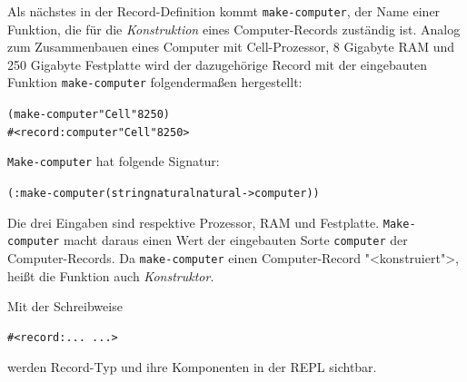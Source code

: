 Als nächstes in der Record-Definition kommt \texttt{make-computer},
der Name einer Funktion, die für die \textit{Konstruktion} eines
Computer-Records zuständig ist.  Analog zum Zusammenbauen eines
Computer mit Cell-Prozessor, 8 Gigabyte RAM und 250 Gigabyte
Festplatte wird der dazugehörige Record mit der eingebauten Funktion
\texttt{make-computer} folgendermaßen hergestellt:
%
\begin{alltt}
(make-computer "Cell" 8 250)
\evalsto{} #<record:computer "Cell" 8 250>
\end{alltt}
%
\texttt{Make-computer} hat folgende Signatur:
%
\begin{alltt}
(: make-computer (string natural natural -> computer))
\end{alltt}
%
Die drei Eingaben sind respektive Prozessor, RAM und Festplatte.
\texttt{Make-computer} macht daraus einen Wert der eingebauten Sorte
\texttt{computer} der Computer-Records.  Da \texttt{make-computer}
einen Computer-Record "<konstruiert">, heißt die Funktion auch
\textit{Konstruktor}.

Mit der Schreibweise
%
\begin{verbatim}
#<record:... ...>
\end{verbatim}
%
werden Record-Typ und ihre Komponenten in der REPL sichtbar.

